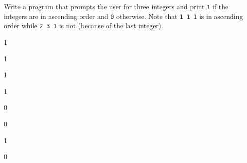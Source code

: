 Write a program that prompts the user for three integers and print \verb!1! if
the integers are in ascending order and \verb!0! otherwise. Note that
\verb!1 1 1! is in ascending order while \verb!2 3 1! is not (because of the
last integer).

\resett
\nextt
\begin{console}[commandchars=\\\{\}]
1
\end{console}

\nextt
\begin{console}[commandchars=\\\{\}]
1
\end{console}

\nextt
\begin{console}[commandchars=\\\{\}]
1
\end{console}

\nextt
\begin{console}[commandchars=\\\{\}]
1
\end{console}

\nextt
\begin{console}[commandchars=\\\{\}]
0
\end{console}

\nextt
\begin{console}[commandchars=\\\{\}]
0
\end{console}

\nextt
\begin{console}[commandchars=\\\{\}]
1
\end{console}

\nextt
\begin{console}[commandchars=\\\{\}]
0
\end{console}
